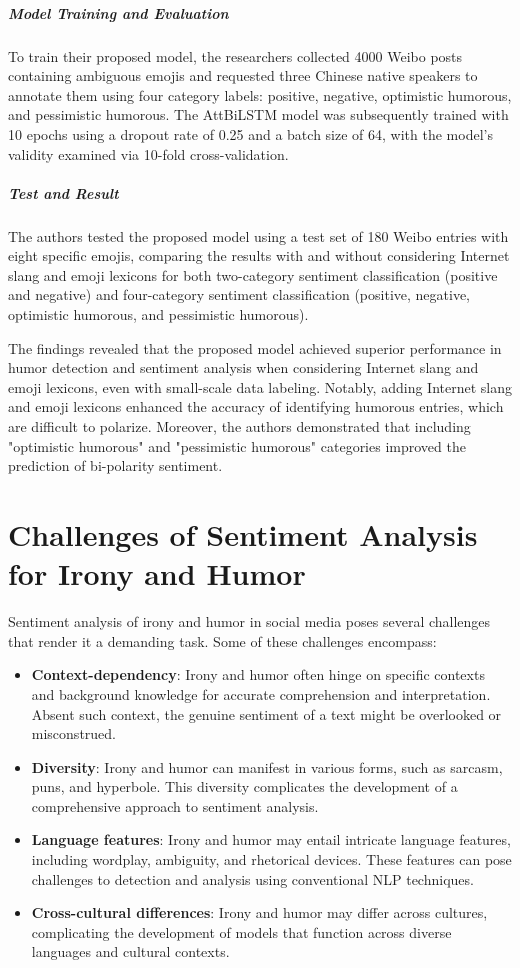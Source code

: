 \documentclass[a4paper]{article}
\begin{document}
\subparagraph{Model Training and Evaluation}To train their proposed model, the researchers collected 4000 Weibo posts containing ambiguous emojis and requested three Chinese native speakers to annotate them using four category labels: positive, negative, optimistic humorous, and pessimistic humorous. The AttBiLSTM model was subsequently trained with 10 epochs using a dropout rate of 0.25 and a batch size of 64, with the model's validity examined via 10-fold cross-validation.

\subparagraph{Test and Result}The authors tested the proposed model using a test set of 180 Weibo entries with eight specific emojis, comparing the results with and without considering Internet slang and emoji lexicons for both two-category sentiment classification (positive and negative) and four-category sentiment classification (positive, negative, optimistic humorous, and pessimistic humorous).

The findings revealed that the proposed model achieved superior performance in humor detection and sentiment analysis when considering Internet slang and emoji lexicons, even with small-scale data labeling. Notably, adding Internet slang and emoji lexicons enhanced the accuracy of identifying humorous entries, which are difficult to polarize. Moreover, the authors demonstrated that including "optimistic humorous" and "pessimistic humorous" categories improved the prediction of bi-polarity sentiment.


\section{Challenges of Sentiment Analysis for Irony and Humor}
Sentiment analysis of irony and humor in social media poses several challenges that render it a demanding task. Some of these challenges encompass:

\begin{itemize}
\item \textbf{Context-dependency}: Irony and humor often hinge on specific contexts and background knowledge for accurate comprehension and interpretation. Absent such context, the genuine sentiment of a text might be overlooked or misconstrued.
\item \textbf{Diversity}: Irony and humor can manifest in various forms, such as sarcasm, puns, and hyperbole. This diversity complicates the development of a comprehensive approach to sentiment analysis.
\item \textbf{Language features}: Irony and humor may entail intricate language features, including wordplay, ambiguity, and rhetorical devices. These features can pose challenges to detection and analysis using conventional NLP techniques.
\item \textbf{Cross-cultural differences}: Irony and humor may differ across cultures, complicating the development of models that function across diverse languages and cultural contexts.
\end{itemize}
\end{document}
